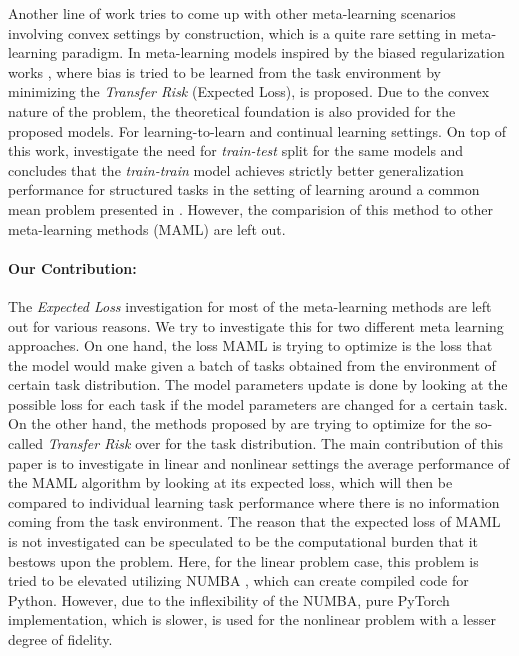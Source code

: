 Another line of work tries to come up with other meta-learning scenarios involving convex settings by construction, which is a quite rare setting in meta-learning paradigm. In \cite{Denevi2018a, Denevi2019} meta-learning models inspired by the biased regularization works \cite{Kuzborskij2017, Kuzborskij2017a}, where bias is tried to be learned from the task environment by minimizing the \textit{Transfer Risk} (Expected Loss), is proposed. Due to the convex nature of the problem, the theoretical foundation is also provided for the proposed models. For learning-to-learn and continual learning settings. On top of this work, \cite{Bai2020} investigate the need for \textit{train-test} split for the same models and concludes that the \textit{train-train} model achieves strictly better generalization performance for structured tasks in the setting of learning around a common mean problem presented in \cite{Denevi2018a}. However, the comparision of this method to other meta-learning methods (\eg MAML) are left out.


\paragraph{Our Contribution:} The \textit{Expected Loss} investigation for most of the meta-learning methods are left out for various reasons. We try to investigate this for two different meta learning approaches. On one hand, the loss MAML \cite{Finn2017} is trying to optimize is the loss that the model would make given a batch of tasks obtained from the environment of certain task distribution. The model parameters update is done by looking at the possible loss for each task if the model parameters are changed for a certain task. On the other hand, the methods proposed by \cite{Denevi2018a} are trying to optimize for the so-called \textit{Transfer Risk} over for the task distribution. The main contribution of this paper is to investigate in linear and nonlinear settings the average performance of the MAML algorithm by looking at its expected loss, which will then be compared to individual learning task performance where there is no information coming from the task environment. The reason that the expected loss of MAML is not investigated can be speculated to be the computational burden that it bestows upon the problem. Here, for the linear problem case, this problem is tried to be elevated utilizing NUMBA \cite{Lam2015}, which can create compiled code for Python. However, due to the inflexibility of the NUMBA, pure PyTorch \cite{Paszke2019} implementation, which is slower, is used for the nonlinear problem with a lesser degree of fidelity. 


